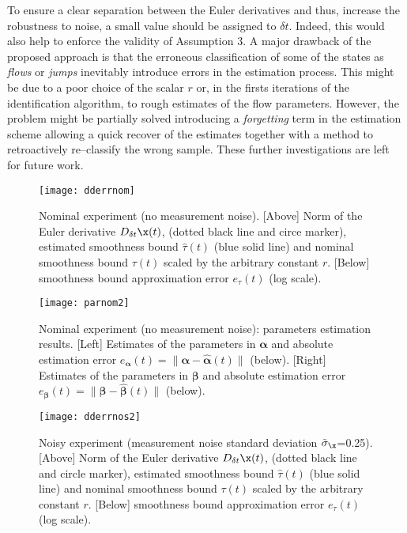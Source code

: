  To ensure a clear separation between the Euler derivatives and thus, increase the robustness to noise, a small value should be assigned to $\delta t$. {%
 Indeed, this would also help to enforce the validity of Assumption 3.
 }
 {%
 A major drawback of the proposed approach is that the erroneous classification of some of the states as \textit{flows} or \textit{jumps} inevitably introduce errors in the estimation process. This might be due to a poor choice of the scalar $r$ or, in the firsts iterations of the identification algorithm, to rough estimates of the flow parameters. 
However, the problem might be partially solved introducing a \textit{forgetting} term in the estimation scheme \cite{soderstrom2018errors} allowing a quick recover of the estimates together with a method to retroactively re--classify the wrong sample. These further investigations are left for future work.
 }
\begin{figure}[t!]
	\centering
	\texttt{[image: dderrnom]}
	\caption[Nominal experiment: norm of the Euler derivative and estimated smoothness bound.]{Nominal experiment (no measurement noise). [Above] Norm of the Euler derivative $D_{\delta t}\x(t)$, (dotted black line and circe marker), estimated smoothness bound $\hat{\tau}(t)$ (blue solid line) and nominal smoothness bound $\tau(t)$ scaled by the arbitrary constant $r$. [Below] smoothness bound approximation error $e_{\tau}(t)$ (log scale).}
	\label{fig:dderrnom}
\end{figure}
%
%
\begin{figure}[t!]
	\centering
	\texttt{[image: parnom2]}
	\caption[Nominal experiment: parameters estimation results.]{Nominal experiment (no measurement noise): parameters estimation results. [Left] Estimates of the parameters in $\bm{\alpha}$ and absolute estimation error $e_{\bm{\alpha}}(t)=\|\bm{\alpha}-\hat{\bm{\alpha}}(t)\|$ (below). [Right] Estimates of the parameters in $\bm{\beta}$ and absolute estimation error $e_{\bm{\beta}}(t)=\|\bm{\beta}-\hat{\bm{\beta}}(t)\|$ (below).}
	\label{fig:parnom}
\end{figure}
%
\begin{figure}[t!]
	\centering
	\texttt{[image: dderrnos2]}
	\caption[Noisy experiment: norm of the Euler derivative and estimated smoothness bound.]{Noisy experiment (measurement noise standard deviation $\tilde{\sigma}_{\x}$=0.25). [Above] Norm of the Euler derivative $D_{\delta t}\x(t)$, (dotted black line and circle marker), estimated smoothness bound $\hat{\tau}(t)$ (blue solid line) and nominal smoothness bound $\tau(t)$ scaled by the arbitrary constant $r$. [Below] smoothness bound approximation error $e_{\tau}(t)$ (log scale).}
	\label{fig:dderrnos}
\end{figure}
